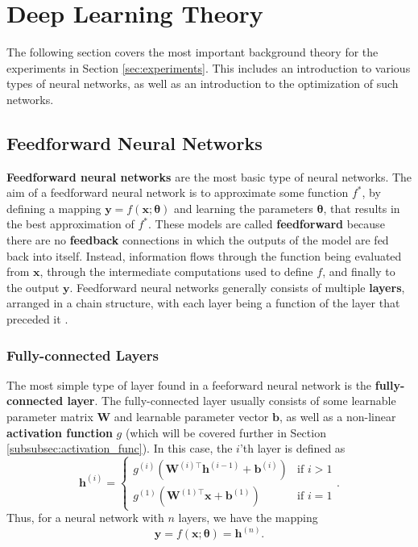\documentclass[./main.tex]{subfiles}
\begin{document}
\section{Deep Learning Theory}
The following section covers the most important background theory for the experiments in Section \ref{sec:experiments}. This includes an introduction to various types of neural networks, as well as an introduction to the optimization of such networks.

\subsection{Feedforward Neural Networks}
\textbf{Feedforward neural networks} are the most basic type of neural networks. The aim of a feedforward neural network is to approximate some function $f^*$, by defining a mapping $\bm{y} = f(\bm{x}; \bm{\theta})$ and learning the parameters $\bm{\theta}$, that results in the best approximation of $f^*$. These models are called \textbf{feedforward} because there are no \textbf{feedback} connections in which the outputs of the model are fed back into itself. Instead, information flows through the function being evaluated from $\bm{x}$, through the intermediate computations used to define $f$, and finally to the output $\bm{y}$. Feedforward neural networks generally consists of multiple \textbf{layers}, arranged in a chain structure, with each layer being a function of the layer that preceded it \cite{DL_book}. 

\subsubsection{Fully-connected Layers}
The most simple type of layer found in a feeforward neural network is the \textbf{fully-connected layer}. The fully-connected layer usually consists of some learnable parameter matrix $\bm{W}$ and learnable parameter vector $\bm{b}$, as well as a non-linear \textbf{activation function} $g$ (which will be covered further in Section \ref{subsubsec:activation_func}). In this case, the $i$'th layer is defined as
\begin{equation}
    \bm{h}^{(i)} =
    \begin{cases}
        g^{(i)} \left( \bm{W}^{(i) \top} \bm{h}^{(i - 1)} + \bm{b}^{(i)} \right) & \text{if } i > 1 \\
        g^{(1)} \left( \bm{W}^{(1) \top} \bm{x} + \bm{b}^{(1)} \right) & \text{if } i = 1
    \end{cases}
    .
\end{equation}
Thus, for a neural network with $n$ layers, we have the mapping \cite{DL_book}
\begin{equation}
    \bm{y} = f(\bm{x};\bm{\theta}) = \bm{h}^{(n)}.
\end{equation}
\end{document}
